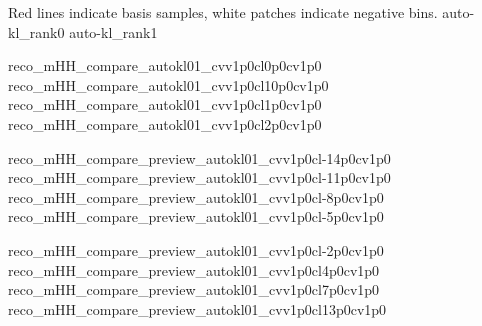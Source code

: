 


{Red lines indicate basis samples, white patches indicate negative bins.}
{auto-kl_rank0}
{auto-kl_rank1}

{reco_mHH_compare_autokl01_cvv1p0cl0p0cv1p0}
{reco_mHH_compare_autokl01_cvv1p0cl10p0cv1p0}
{reco_mHH_compare_autokl01_cvv1p0cl1p0cv1p0}
{reco_mHH_compare_autokl01_cvv1p0cl2p0cv1p0}

{reco_mHH_compare_preview_autokl01_cvv1p0cl-14p0cv1p0}
{reco_mHH_compare_preview_autokl01_cvv1p0cl-11p0cv1p0}
{reco_mHH_compare_preview_autokl01_cvv1p0cl-8p0cv1p0}
{reco_mHH_compare_preview_autokl01_cvv1p0cl-5p0cv1p0}

{reco_mHH_compare_preview_autokl01_cvv1p0cl-2p0cv1p0}
{reco_mHH_compare_preview_autokl01_cvv1p0cl4p0cv1p0}
{reco_mHH_compare_preview_autokl01_cvv1p0cl7p0cv1p0}
{reco_mHH_compare_preview_autokl01_cvv1p0cl13p0cv1p0}


